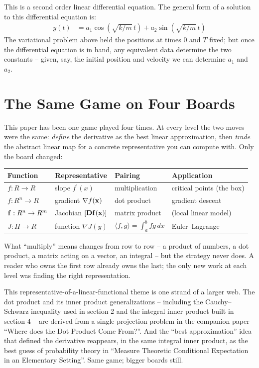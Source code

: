 \documentclass{article}
\begin{document}
This is a second order linear differential equation.
The general form of a solution to this differential equation is:
\begin{align}
  y(t) &= a_1 \cos(\sqrt{k/m}\, t) + a_2 \sin(\sqrt{k/m}\, t)
\end{align}
The variational problem above held the positions at times $0$ and $T$
fixed; but once the differential equation is in hand, any equivalent data
determine the two constants -- given, say, the initial position and
velocity we can determine $a_1$ and $a_2$.

\section{The Same Game on Four Boards}
This paper has been one game played four times. At every level the two
moves were the same: {\em define\/} the derivative as the best linear
approximation, then {\em trade\/} the abstract linear map for a concrete
representative you can compute with. Only the board changed:

\begin{center}
\begin{tabular}{l|l|l|l}
{\bf Function} & {\bf Representative} & {\bf Pairing} & {\bf Application} \\
\hline
$f: R \rightarrow R$ & slope $f^\prime(x)$ & multiplication & critical points (the box) \\
$f: R^n \rightarrow R$ & gradient $\nabla f({\bf x})$ & dot product & gradient descent \\
${\bf f}: R^n \rightarrow R^m$ & Jacobian $[{\bf Df}({\bf x})]$ & matrix product & (local linear model) \\
$J: H \rightarrow R$ & function $\nabla J(y)$ & $\langle f, g \rangle = \int_a^b f g\, dx$ & Euler--Lagrange \\
\end{tabular}
\end{center}

What ``multiply''{} means changes from row to row -- a product of numbers,
a dot product, a matrix acting on a vector, an integral -- but the
strategy never does. A reader who owns the first row already owns the
last; the only new work at each level was finding the right
representation.

This representative-of-a-linear-functional theme is one strand of a larger
web. The dot product and its inner product generalizations -- including
the Cauchy--Schwarz inequality used in section 2 and the integral inner
product built in section 4 -- are derived from a single projection problem
in the companion paper ``Where does the Dot Product Come From?''. And the
``best approximation''{} idea that defined the derivative reappears, in
the same integral inner product, as the best guess of probability theory
in ``Measure Theoretic Conditional Expectation in an Elementary
Setting''. Same game; bigger boards still.
\end{document}
